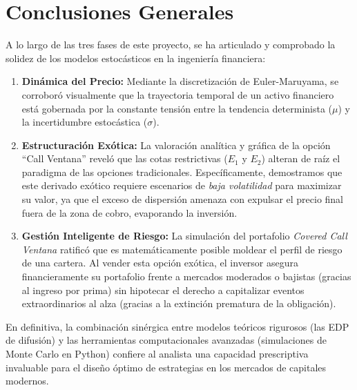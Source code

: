 \documentclass[12pt]{article}
\begin{document}
\section{Conclusiones Generales}
A lo largo de las tres fases de este proyecto, se ha articulado y comprobado la solidez de los modelos estocásticos en la ingeniería financiera:
\begin{enumerate}
    \item \textbf{Dinámica del Precio:} Mediante la discretización de Euler-Maruyama, se corroboró visualmente que la trayectoria temporal de un activo financiero está gobernada por la constante tensión entre la tendencia determinista ($\mu$) y la incertidumbre estocástica ($\sigma$).
    \item \textbf{Estructuración Exótica:} La valoración analítica y gráfica de la opción ``Call Ventana'' reveló que las cotas restrictivas ($E_1$ y $E_2$) alteran de raíz el paradigma de las opciones tradicionales. Específicamente, demostramos que este derivado exótico requiere escenarios de \textit{baja volatilidad} para maximizar su valor, ya que el exceso de dispersión amenaza con expulsar el precio final fuera de la zona de cobro, evaporando la inversión.
    \item \textbf{Gestión Inteligente de Riesgo:} La simulación del portafolio \textit{Covered Call Ventana} ratificó que es matemáticamente posible moldear el perfil de riesgo de una cartera. Al vender esta opción exótica, el inversor asegura financieramente su portafolio frente a mercados moderados o bajistas (gracias al ingreso por prima) sin hipotecar el derecho a capitalizar eventos extraordinarios al alza (gracias a la extinción prematura de la obligación).
\end{enumerate}
En definitiva, la combinación sinérgica entre modelos teóricos rigurosos (las EDP de difusión) y las herramientas computacionales avanzadas (simulaciones de Monte Carlo en Python) confiere al analista una capacidad prescriptiva invaluable para el diseño óptimo de estrategias en los mercados de capitales modernos.
\end{document}
